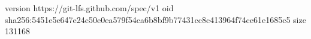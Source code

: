 version https://git-lfs.github.com/spec/v1
oid sha256:5451e5e647e24c50e0ea579f54ca6b8bf9b77431cc8c413964f74ce61e1685c5
size 131168
